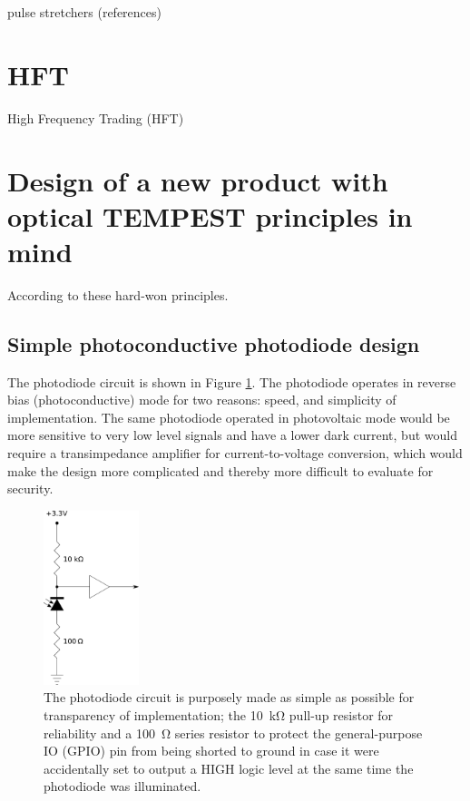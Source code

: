 \documentclass[conference]{IEEEtran}
\begin{document}
pulse stretchers (references)

\section{HFT}

High Frequency Trading (HFT)

\section{Design of a new product with optical TEMPEST principles
in mind}

According to these hard-won principles.

\subsection{Simple photoconductive photodiode design}

The photodiode circuit is shown in Figure \ref{figure:photodiode_pullup}.
The photodiode operates in reverse bias (photoconductive) mode for two
reasons: speed, and simplicity of implementation. The same photodiode
operated in photovoltaic mode would be more sensitive to very low level
signals and have a lower dark current, but would require a transimpedance
amplifier for current-to-voltage conversion, which would make the design
more complicated and thereby more difficult to evaluate for security.

\begin{figure}[!t]
    \centering
	\includegraphics[height=2in]{graphics/photodiode_pullup_and_GPIO_protection.png}
	\caption{The photodiode circuit is purposely made as simple as possible
        for transparency of implementation; the \SI{10}{\kilo\ohm} pull-up
        resistor for reliability and a \SI{100}{\ohm} series resistor to
        protect the general-purpose IO (GPIO) pin from being shorted to
        ground in case it were accidentally set to output a HIGH logic level
        at the same time the photodiode was illuminated.}
	\label{figure:photodiode_pullup}
\end{figure}
\end{document}
